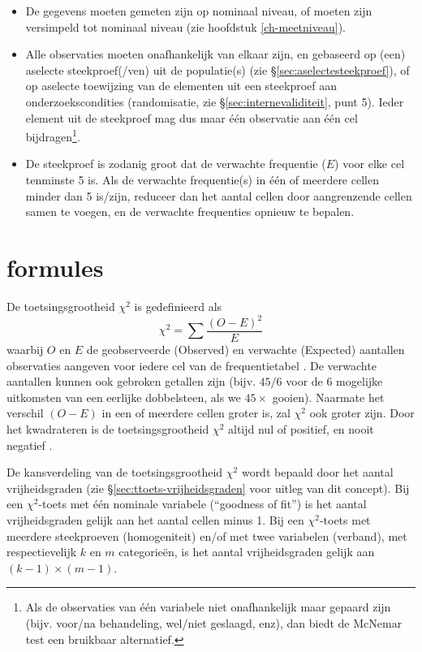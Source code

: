 \documentclass[
]{book}
\begin{document}
\begin{itemize}
\item
  De gegevens moeten gemeten zijn op nominaal niveau, of moeten
  zijn versimpeld tot nominaal niveau (zie hoofdstuk \ref{ch-meetniveau}).
\item
  Alle observaties moeten onafhankelijk van elkaar zijn, en
  gebaseerd op (een) aselecte steekproef(/ven) uit de populatie(s) (zie
  §\ref{sec:aselectesteekproef}), of op aselecte toewijzing van de
  elementen uit een steekproef aan onderzoekscondities (randomisatie, zie §\ref{sec:internevaliditeit}, punt 5). Ieder element uit de steekproef mag dus maar één observatie aan één
  cel bijdragen\footnote{Als de observaties van één variabele niet onafhankelijk maar gepaard zijn (bijv. voor/na behandeling, wel/niet geslaagd, enz), dan biedt de McNemar test een bruikbaar alternatief.}.
\item
  De steekproef is zodanig groot dat de verwachte frequentie
  (\(E\)) voor elke cel tenminste 5 is. Als de verwachte frequentie(s) in
  één of meerdere cellen minder dan 5 is/zijn, reduceer dan het aantal
  cellen door aangrenzende cellen samen te voegen, en de verwachte
  frequenties opnieuw te bepalen.
\end{itemize}

\section{formules}\label{formules-6}

De toetsingsgrootheid \(\chi^2\) is gedefinieerd als
\begin{equation}
  \label{eq:chikwadraat}
    \chi^2 = \sum \frac{(O-E)^2}{E}
\end{equation}
waarbij \(O\) en \(E\) de
geobserveerde (Observed) en verwachte (Expected) aantallen observaties
aangeven voor iedere cel van de frequentietabel \citep{Ferg89}. De verwachte
aantallen kunnen ook gebroken getallen zijn (bijv. \(45/6\) voor de 6
mogelijke uitkomsten van een eerlijke dobbelsteen, als we \(45\times\)
gooien). Naarmate het verschil \((O-E)\) in een of meerdere cellen groter
is, zal \(\chi^2\) ook groter zijn. Door het kwadrateren is de
toetsingsgrootheid \(\chi^2\) altijd nul of positief, en nooit negatief
\citep{Ferg89}.

De kansverdeling van de toetsingsgrootheid \(\chi^2\) wordt bepaald door
het aantal vrijheidsgraden (zie
§\ref{sec:ttoets-vrijheidsgraden} voor uitleg van dit concept).
Bij een \(\chi^2\)-toets met één nominale variabele (``goodness of fit'') is het aantal
vrijheidsgraden gelijk aan het aantal cellen minus 1. Bij een \(\chi^2\)-toets met
meerdere steekproeven (homogeniteit) en/of met twee variabelen
(verband), met respectievelijk \(k\) en \(m\) categorieën, is het aantal
vrijheidsgraden gelijk aan \((k-1)\times(m-1)\).
\end{document}
